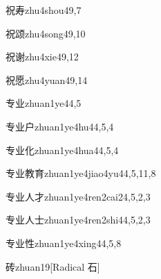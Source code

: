 \begin{entry}{祝寿}{zhu4shou4}{9,7}
\end{entry}

\begin{entry}{祝颂}{zhu4song4}{9,10}
\end{entry}

\begin{entry}{祝谢}{zhu4xie4}{9,12}
\end{entry}

\begin{entry}{祝愿}{zhu4yuan4}{9,14}
\end{entry}

\begin{entry}{专业}{zhuan1ye4}{4,5}
\end{entry}

\begin{entry}{专业户}{zhuan1ye4hu4}{4,5,4}
\end{entry}

\begin{entry}{专业化}{zhuan1ye4hua4}{4,5,4}
\end{entry}

\begin{entry}{专业教育}{zhuan1ye4jiao4yu4}{4,5,11,8}
\end{entry}

\begin{entry}{专业人才}{zhuan1ye4ren2cai2}{4,5,2,3}
\end{entry}

\begin{entry}{专业人士}{zhuan1ye4ren2shi4}{4,5,2,3}
\end{entry}

\begin{entry}{专业性}{zhuan1ye4xing4}{4,5,8}
\end{entry}

\begin{entry}{砖}{zhuan1}{9}[Radical 石]
\end{entry}

